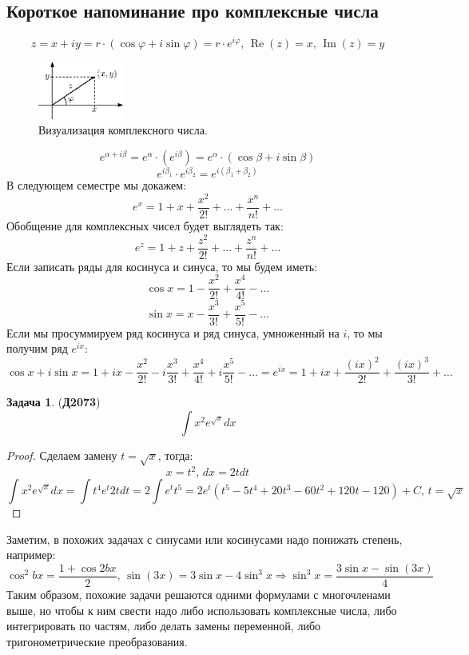 \documentclass[12pt]{article}
\theoremstyle{definition}
\newtheorem{problem}{Задача}
\DeclareMathOperator{\dint}{\displaystyle\int}
\DeclareMathOperator{\IM}{\operatorname{Im}}
\DeclareMathOperator{\RE}{\operatorname{Re}}
\begin{document}
\subsection*{Короткое напоминание про комплексные числа}
$$
	z = x + iy = r{\cdot}(\cos{\varphi} + i\sin{\varphi}) = r{\cdot}e^{ i\varphi}, \, \RE{(z)} = x, \, \IM{(z)} = y
$$
\begin{figure}[H]
	\centering
	\includegraphics[width=0.25\textwidth]{MA2S7_1.eps}
	\caption{Визуализация комплексного числа.}
	\label{7_1}
\end{figure}
$$
	e^{\alpha + i\beta} = e^{\alpha}{\cdot}(e^{i\beta}) = e^{\alpha}{\cdot}(\cos{\beta} + i\sin{\beta})
$$
$$
	e^{i\beta_1}{\cdot}e^{i\beta_2} = e^{i(\beta_1 + \beta_2)}
$$
В следующем семестре мы докажем:
$$
	e^{x} = 1 + x + \dfrac{x^2}{2!} + \dotsc + \dfrac{x^n}{n!} + \dotsc
$$
Обобщение для комплексных чисел будет выглядеть так:
$$
	e^z = 1 + z + \dfrac{z^2}{2!} + \dotsc  + \dfrac{z^n}{n!} + \dotsc
$$
Если записать ряды для косинуса и синуса, то мы будем иметь:
$$
	\cos{x} = 1 - \dfrac{x^2}{2!} + \dfrac{x^4}{4!} - \dotsc 
$$
$$
	\sin{x} = x - \dfrac{x^3}{3!} + \dfrac{x^5}{5!} - \dotsc
$$
Если мы просуммируем ряд косинуса и ряд синуса, умноженный на $i$, то мы получим ряд $e^{ix}$:
$$
	\cos{x} + i\sin{x} = 1 + ix - \dfrac{x^2}{2!} - i\dfrac{x^3}{3!} + \dfrac{x^4}{4!} + i\dfrac{x^5}{5!} - \dotsc = e^{ix} = 1 + ix + \dfrac{(ix)^2}{2!} +\dfrac{(ix)^3}{3!} + \dotsc 
$$

\begin{problem}(\textbf{Д2073})
	$$
		\dint x^2 e^{\sqrt{x}} dx
	$$
\end{problem}
\begin{proof}
	Сделаем замену $t = \sqrt{x}$, тогда:
	$$
		x = t^2, \, dx = 2tdt 
	$$
	$$
		\dint x^2 e^{\sqrt{x}} dx = \dint t^4 e^t 2t dt = 2 \dint e^t t^5 = 2e^t\left(t^5 - 5t^4 + 20t^3 - 60t^2 + 120t - 120\right) + C, \, t = \sqrt{x}
	$$
\end{proof}
Заметим, в похожих задачах с синусами или косинусами надо понижать степень, например:
$$
	\cos^2{bx} = \dfrac{1 + \cos{2bx}}{2}, \, \sin{(3x)} = 3\sin{x} - 4\sin^3{x} \Rightarrow \sin^3{x} = \dfrac{ 3\sin{x} - \sin{(3x)} }{4}
$$
Таким образом, похожие задачи решаются одними формулами с многочленами выше, но чтобы к ним свести надо либо использовать комплексные числа, либо интегрировать по частям, либо делать замены переменной, либо тригонометрические преобразования.
\end{document}
